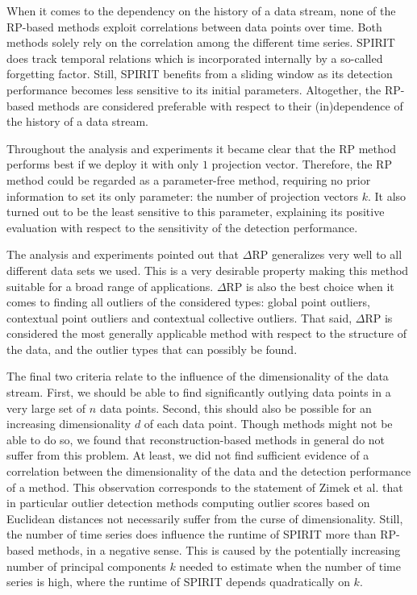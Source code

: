 When it comes to the dependency on the history of a data stream, none of the RP-based methods exploit correlations between data points over time. Both methods solely rely on the correlation among the different time series. SPIRIT does track temporal relations which is incorporated internally by a so-called forgetting factor. Still, SPIRIT benefits from a sliding window as its detection performance becomes less sensitive to its initial parameters. Altogether, the RP-based methods are considered preferable with respect to their (in)dependence of the history of a data stream.

Throughout the analysis and experiments it became clear that the RP method performs best if we deploy it with only $1$ projection vector. Therefore, the RP method could be regarded as a parameter-free method, requiring no prior information to set its only parameter: the number of projection vectors $k$. It also turned out to be the least sensitive to this parameter, explaining its positive evaluation with respect to the sensitivity of the detection performance. 

The analysis and experiments pointed out that $\Delta$RP generalizes very well to all different data sets we used. This is a very desirable property making this method suitable for a broad range of applications. $\Delta$RP is also the best choice when it comes to finding all outliers of the considered types: global point outliers, contextual point outliers and contextual collective outliers. That said, $\Delta$RP is considered the most generally applicable method with respect to the structure of the data, and the outlier types that can possibly be found.

The final two criteria relate to the influence of the dimensionality of the data stream. First, we should be able to find significantly outlying data points in a very large set of $n$ data points. Second, this should also be possible for an increasing dimensionality $d$ of each data point. Though methods might not be able to do so, we found that reconstruction-based methods in general do not suffer from this problem. At least, we did not find sufficient evidence of a correlation between the dimensionality of the data and the detection performance of a method. This observation corresponds to the statement of Zimek et al. \cite{zimek2012survey} that in particular outlier detection methods computing outlier scores based on Euclidean distances not necessarily suffer from the curse of dimensionality. Still, the number of time series does influence the runtime of SPIRIT more than RP-based methods, in a negative sense. This is caused by the potentially increasing number of principal components $k$ needed to estimate when the number of time series is high, where the runtime of SPIRIT depends quadratically on $k$.
 
